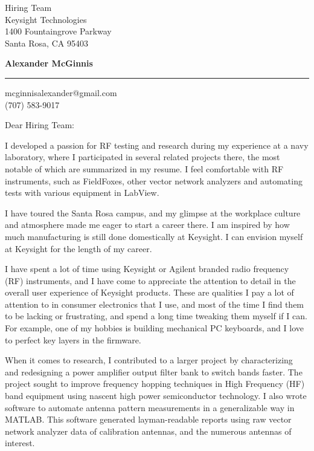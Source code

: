 \documentclass[11pt]{letter}
\makeatletter
\def \myname {Alexander McGinnis}
\def \myemail {mcginnisalexander@gmail.com}
\def \theirname {Hiring Team}
\makeatother
\begin{document}
\signature{\myname}           %
\longindentation=0pt                       %
\let\raggedleft\raggedright                %


\begin{letter}{\theirname \\
Keysight Technologies \\
1400 Fountaingrove Parkway \\
Santa Rosa, CA 95403
}


\begin{flushleft}
{\large\bf \myname}
\end{flushleft}
\medskip\hrule height 1pt
\begin{flushright}
\hfill \myemail \\
\hfill (707) 583-9017 \\
\end{flushright}


\opening{Dear \theirname :}


I developed a passion for RF testing and research during my experience at a navy laboratory, where I participated in several related projects there, the most notable of which are summarized in my resume. I feel comfortable with RF instruments, such as FieldFoxes, other vector network analyzers and automating tests with various equipment in LabView.

I have toured the Santa Rosa campus, and my glimpse at the workplace culture and atmosphere made me eager to start a career there. I am inspired by how much manufacturing is still done domestically at Keysight. I can envision myself at Keysight for the length of my career.

I have spent a lot of time using Keysight or Agilent branded radio frequency (RF) instruments, and I have come to appreciate the attention to detail in the overall user experience of Keysight products. These are qualities I pay a lot of attention to in consumer electronics that I use, and most of the time I find them to be lacking or frustrating, and spend a long time tweaking them myself if I can. For example, one of my hobbies is building mechanical PC keyboards, and I love to perfect key layers in the firmware.

When it comes to research, I contributed to a larger project by characterizing and redesigning a power amplifier output filter bank to switch bands faster. The project sought to improve frequency hopping techniques in High Frequency (HF) band equipment using nascent high power semiconductor technology. I also wrote software to automate antenna pattern measurements in a generalizable way in MATLAB. This software generated layman-readable reports using raw vector network analyzer data of calibration antennas, and the numerous antennas of interest.


\end{letter}
\end{document}
